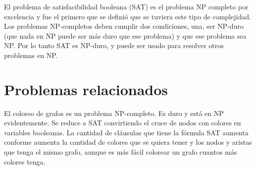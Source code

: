 \documentclass[a4paper]{article}
\begin{document}
El problema de satisfacibilidad booleana (SAT) es el problema NP completo por excelencia y fue el primero que se definió que se tuviera este tipo de complejidad. Los problemas NP-completos deben cumplir dos condiciones, una, ser NP-duro (que nada en NP puede ser más duro que ese problema) y que ese problema sea NP. Por lo tanto SAT es NP-duro, y puede ser usado para resolver otros problemas en NP.

\section{Problemas relacionados}

El coloreo de grafos es un problema NP-completo. Es duro y está en NP evidentemente. Se reduce a SAT convirtiendo el cruce de nodos con colores en variables booleanas. La cantidad de cláusulas que tiene la fórmula SAT aumenta conforme aumenta la cantidad de colores que se quiera tener y los nodos y aristas que tenga el mismo grafo, aunque es más fácil colorear un grafo cuantos más colores tenga.
\end{document}
